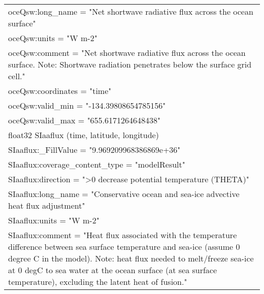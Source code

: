 \begin{longtable}{|p{\textwidth}|}
\hspace{0.5cm}\hspace{0.5cm}oceQsw:long\_name = "Net shortwave radiative flux across the ocean surface"\\
\hspace{0.5cm}\hspace{0.5cm}oceQsw:units = "W m-2"\\
\hspace{0.5cm}\hspace{0.5cm}oceQsw:comment = "Net shortwave radiative flux across the ocean surface. Note: Shortwave radiation penetrates below the surface grid cell."\\
\hspace{0.5cm}\hspace{0.5cm}oceQsw:coordinates = "time"\\
\hspace{0.5cm}\hspace{0.5cm}oceQsw:valid\_min = "-134.39808654785156"\\
\hspace{0.5cm}\hspace{0.5cm}oceQsw:valid\_max = "655.6171264648438"\\
\hspace{0.5cm}float32 SIaaflux (time, latitude, longitude)\\
\hspace{0.5cm}\hspace{0.5cm}SIaaflux:\_FillValue = "9.969209968386869e+36"\\
\hspace{0.5cm}\hspace{0.5cm}SIaaflux:coverage\_content\_type = "modelResult"\\
\hspace{0.5cm}\hspace{0.5cm}SIaaflux:direction = ">0 decrease potential temperature (THETA)"\\
\hspace{0.5cm}\hspace{0.5cm}SIaaflux:long\_name = "Conservative ocean and sea-ice advective heat flux adjustment"\\
\hspace{0.5cm}\hspace{0.5cm}SIaaflux:units = "W m-2"\\
\hspace{0.5cm}\hspace{0.5cm}SIaaflux:comment = "Heat flux associated with the temperature difference between sea surface temperature and sea-ice (assume 0 degree C in the model). Note: heat flux needed to melt/freeze sea-ice at 0 degC to sea water at the ocean surface (at sea surface temperature), excluding the latent heat of fusion."\\

\end{longtable}
